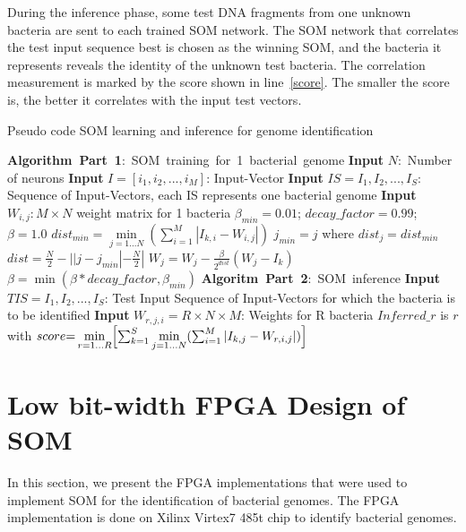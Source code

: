 During the inference phase, some test DNA fragments from one unknown bacteria are sent to each trained SOM network. The SOM network that correlates the test input sequence best is chosen as the winning SOM, and the bacteria it represents reveals the identity of the unknown test bacteria. The correlation measurement is marked by the score shown in  line~\ref{score}. The smaller the score is, the better it correlates with the input test vectors.
\begin{algorithm}[htb]
	 \caption{Pseudo code SOM learning and inference for genome identification}
	\label{alg:algorithm}
	\begin{algorithmic}[1]\label{Algo:SOMTraining}
		\Statex \mbox{\textbf{Algorithm Part 1}: SOM training for 1 bacterial genome}
		\State \textbf{Input} $N:$ Number of neurons
		\State \textbf{Input} $I{=}[i_1, i_2, ..., i_M]$: Input-Vector
       	\State \textbf{Input} $IS{=}{I_1, I_2, ..., I_S}$: Sequence of Input-Vectors, each IS represents one bacterial genome \label{IS_Def}
       	\State \textbf{Input} $W_{i,j}: M\times N$ weight matrix for 1 bacteria
        \State $\beta_{min}=0.01$; $decay\_factor=0.99$; $\beta=1.0$\label{beta_init}
		\State $dist_{min}=\min\limits_{j=1...N}(\sum_{i=1}^{M}|I_{k,i}-W_{i,j}|)$\label{dist_min}
        \State $j_{min} = j$ where $dist_{j} = dist_{min}$\label{j_min}
           \State $dist = \frac{N}{2} - ||j-j_{min}|-\frac{N}{2}|$\label{dist_update} 
           \State $W_j = W_j - \frac{\beta}{2^{dist}}(W_j-I_k)$\label{W_update}
        \EndFor
        \State $\beta = \min(\beta*decay\_factor, \beta_{min})$\label{beta_update}
		\EndFor
  \Statex
   \mbox{\textbf{Algoritm Part 2}: SOM inference}
    \State \textbf{Input} $TIS{=}{I_1, I_2, ..., I_S}$: Test Input Sequence of Input-Vectors for which the bacteria is to be identified
    \State \textbf{Input} $W_{r,j,i}{=}R\times N \times M$: Weights for R bacteria
    \State $Inferred\_r$ is $r$ with\label{inferred_r}
    \State $score{=}\min\limits_{r=1...R}\Bigl[\sum_{k=1}^{S}\min\limits_{j=1...N}(\sum_{i=1}^{M} |I_{k,j}-W_{r,i,j}|)\Bigr]$\label{score}
	\end{algorithmic}
\end{algorithm}
\section{Low bit-width FPGA Design of SOM}\label{custom}
In this section, we present the FPGA implementations that were used to implement SOM for the identification of bacterial genomes. The FPGA implementation is done on Xilinx Virtex7 485t chip to identify bacterial genomes. 

